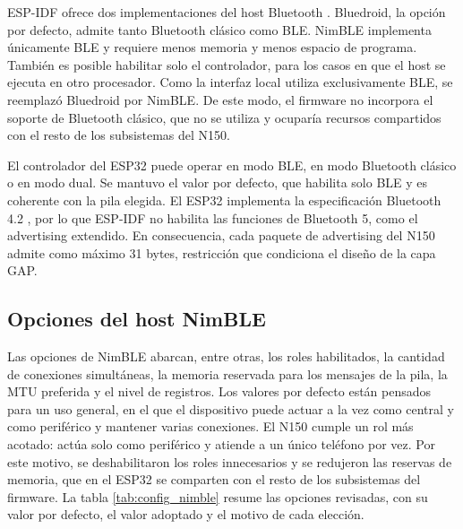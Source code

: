 ESP-IDF ofrece dos implementaciones del host Bluetooth \cite{espressif:esp-idf-ble}. Bluedroid, la opción por defecto, admite tanto Bluetooth clásico como BLE. NimBLE implementa únicamente BLE y requiere menos memoria y menos espacio de programa. También es posible habilitar solo el controlador, para los casos en que el host se ejecuta en otro procesador. Como la interfaz local utiliza exclusivamente BLE, se reemplazó Bluedroid por NimBLE. De este modo, el firmware no incorpora el soporte de Bluetooth clásico, que no se utiliza y ocuparía recursos compartidos con el resto de los subsistemas del N150.

El controlador del ESP32 puede operar en modo BLE, en modo Bluetooth clásico o en modo dual. Se mantuvo el valor por defecto, que habilita solo BLE y es coherente con la pila elegida. El ESP32 implementa la especificación Bluetooth 4.2 \cite{espressif:esp32}, por lo que ESP-IDF no habilita las funciones de Bluetooth 5, como el advertising extendido. En consecuencia, cada paquete de advertising del N150 admite como máximo 31 bytes, restricción que condiciona el diseño de la capa GAP.

\subsection{Opciones del host NimBLE}
\label{subsec:config_nimble}

Las opciones de NimBLE abarcan, entre otras, los roles habilitados, la cantidad de conexiones simultáneas, la memoria reservada para los mensajes de la pila, la MTU preferida y el nivel de registros. Los valores por defecto están pensados para un uso general, en el que el dispositivo puede actuar a la vez como central y como periférico y mantener varias conexiones. El N150 cumple un rol más acotado: actúa solo como periférico y atiende a un único teléfono por vez. Por este motivo, se deshabilitaron los roles innecesarios y se redujeron las reservas de memoria, que en el ESP32 se comparten con el resto de los subsistemas del firmware. La tabla \ref{tab:config_nimble} resume las opciones revisadas, con su valor por defecto, el valor adoptado y el motivo de cada elección.

